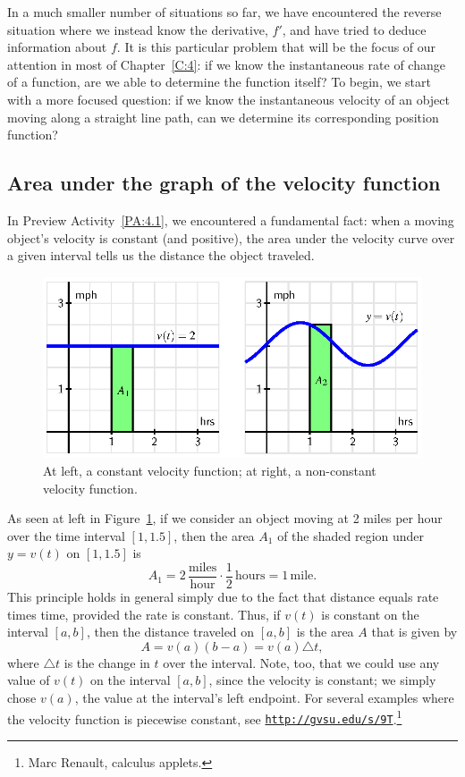 In a much smaller number of situations so far, we have encountered the reverse situation where we instead know the derivative, $f'$, and have tried to deduce information about $f$.  It is this particular problem that will be the focus of our attention in most of Chapter~\ref{C:4}: if we know the instantaneous rate of change of a function, are we able to determine the function itself?  To begin, we start with a more focused question:  if we know the instantaneous velocity of an object moving along a straight line path, can we determine its corresponding position function? 



\subsection*{Area under the graph of the velocity function}

In Preview Activity~\ref{PA:4.1}, we encountered a fundamental fact:  when a moving object's velocity is constant (and positive), the area under the velocity curve over a given interval tells us the distance the object traveled.   
\begin{figure}[h]
\begin{center}
\includegraphics{figures/4_1_VelArea.eps}
\caption{At left, a constant velocity function; at right, a non-constant velocity function.} \label{F:4.1.VelArea}
\end{center}
\end{figure}
As seen at left in Figure~\ref{F:4.1.VelArea}, if we consider an object moving at 2 miles per hour over the time interval $[1,1.5]$, then the area $A_1$ of the shaded region under $y = v(t)$ on $[1,1.5]$ is
$$A _1= 2 \, \frac{\mbox{miles}}{\mbox{hour}} \cdot \frac{1}{2} \, \mbox{hours} = 1 \, \mbox{mile}.$$
This principle holds in general simply due to the fact that distance equals rate times time, provided the rate is constant.  Thus, if $v(t)$ is constant on the interval $[a,b]$, then the distance traveled on $[a,b]$ is the area $A$ that is given by 
$$A = v(a) (b-a) = v(a) \triangle t,$$
where $\triangle t$ is the change in $t$ over the interval.  Note, too, that we could use any value of $v(t)$ on the interval $[a,b]$, since the velocity is constant; we simply chose $v(a)$, the value at the interval's left endpoint.  For several examples where the velocity function is piecewise constant, see \href{http://gvsu.edu/s/9T}{\texttt{http://gvsu.edu/s/9T}}.\footnote{Marc Renault, calculus applets.}	

